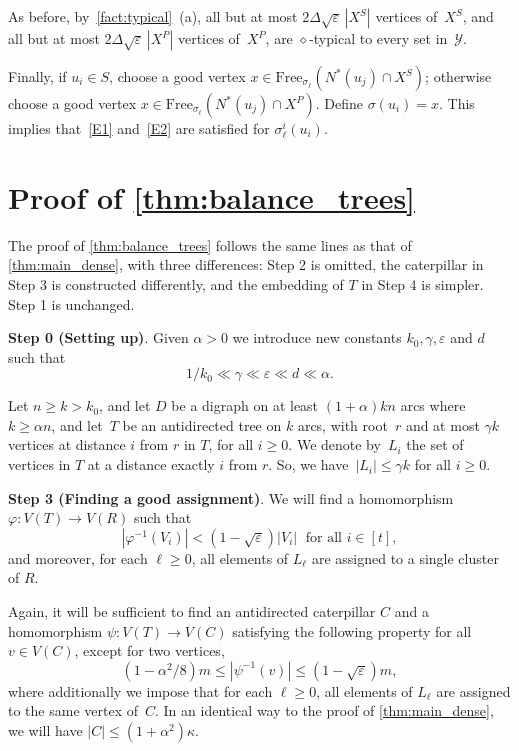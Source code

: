 \documentclass[11pt]{article}
\numberwithin{equation}{section}
\newcommand{\inv}{^{-1}}
\renewcommand{\geq}{\geqslant}
\renewcommand{\leq}{\leqslant}
\def\inv{^{-1}}
\def\Free{\mathrm{Free}}
\let\eps=\varepsilon
\let\phi=\varphi
\theoremstyle{definition}
\def\eps{{\varepsilon}}
\begin{document}
As before, by~\cref{fact:typical}~(a), all but at most $2\Delta\sqrt{\eps}\,|X^{S}|$
vertices of~$X^{S}$, and all but at most $2\Delta\sqrt{\eps}\,|X^{P}|$ vertices
of~$X^{P}$, are $\diamond$-typical to every set in~$\mathcal{Y}$.

Finally, if $u_i \in S$, choose a good vertex $x\in \Free_{\sigma_{\ell}}(N^{\ast}(u_j) \cap X^S)$;
otherwise choose a good vertex $x \in \Free_{\sigma_{\ell}}(N^{\ast}(u_j)\cap X^{P})$. Define $\sigma(u_i) = x$.
This implies that~\ref{E1} and~\ref{E2} are satisfied for $\sigma_{\ell}^{i}(u_i)$.
%
\section{Proof of \cref{thm:balance_trees}}

The proof of \cref{thm:balance_trees} follows the same lines as that of \cref{thm:main_dense},
with three differences: Step 2 is omitted, the caterpillar in Step 3 is constructed differently, and
the embedding of $T$ in Step 4 is simpler. Step 1 is unchanged.


\textbf{Step 0 (Setting up)}.
Given $\alpha > 0$ we introduce new constants $k_0, \gamma, \eps$ and $d$ such that
\[  
1/k_0 \ll \gamma \ll \eps \ll d \ll \alpha.
\]


Let $n \geq k> k_0$, and let $D$ be a digraph on at least $(1+\alpha)kn$ arcs
where $k\geq \alpha n$, and let~$T$ be an antidirected tree on $k$ arcs, with root~$r$ and at most $\gamma k$ vertices at distance $i$ from $r$ in $T$, for all $i\geq 0$. We denote by~$L_i$ the set of vertices in $T$ at a distance exactly $i$ from $r$. So, we have~${|L_i|\leq \gamma k}$ for all $i\geq 0$. 

\textbf{Step 3 (Finding a good assignment)}. We will find a homomorphism $\phi:V(T) \longrightarrow V(R)$ such that
\begin{equation}\label{eq:assignment_layers}
    |\phi\inv(V_i)| < (1- \sqrt{\eps})|V_i|\;\text{ for all } i \in [t],
\end{equation}
and moreover, for each $\ell\geq 0$, all elements of $L_\ell$ are assigned to a single cluster of $R$.

Again, it will be sufficient to find an antidirected caterpillar $C$ and a homomorphism $\psi:V(T)\longrightarrow V(C)$ satisfying the following property for
all $v \in V(C)$, except for two vertices,
\begin{equation}
    \label{eq:full_cat_layers}
    (1-\alpha^2/8)m \leq |\psi\inv(v)|\leq (1-\sqrt{\eps})m,
\end{equation}
where additionally we impose that for each $\ell\geq 0$, all elements of $L_\ell$ are assigned to the same vertex of~$C$.
In an identical way to the proof of \cref{thm:main_dense}, we will have $|C|\leq (1+\alpha^2)\kappa$.
\end{document}

